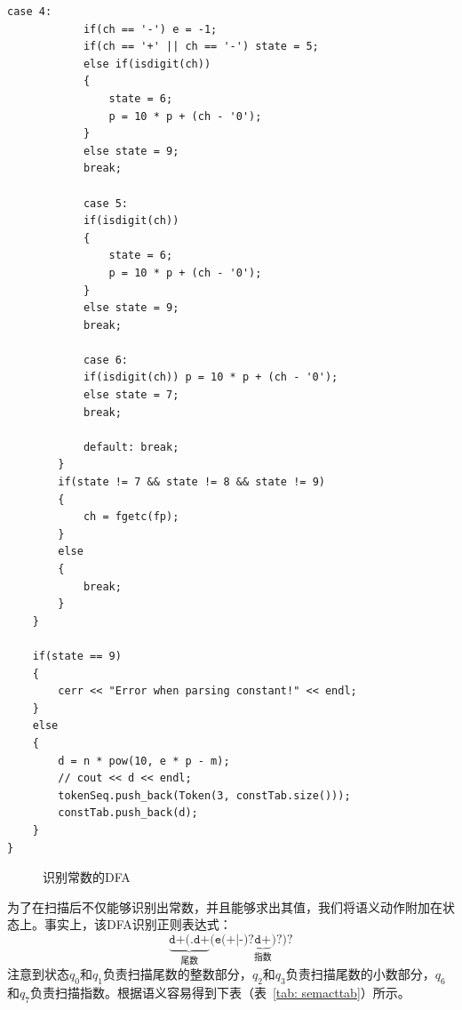 \documentclass{article}
\begin{document}
\begin{CJK*}{UTF8}{gbsn}
\begin{center}
\begin{lstlisting}[caption = {\texttt{readConst} 成员函数代码清单}, label = {lst: readconstlst}]
			case 4: 
			if(ch == '-') e = -1;
			if(ch == '+' || ch == '-') state = 5;
			else if(isdigit(ch))
			{
				state = 6;
				p = 10 * p + (ch - '0');
			}
			else state = 9;
			break;

			case 5:
			if(isdigit(ch)) 
			{
				state = 6;
				p = 10 * p + (ch - '0');
			}
			else state = 9;
			break;

			case 6:
			if(isdigit(ch)) p = 10 * p + (ch - '0');
			else state = 7;
			break;

			default: break;
		}
		if(state != 7 && state != 8 && state != 9)
		{
			ch = fgetc(fp);
		}
		else
		{
			break;
		}
	}

	if(state == 9)
	{
		cerr << "Error when parsing constant!" << endl;
	}
	else
	{
		d = n * pow(10, e * p - m);
		// cout << d << endl;
		tokenSeq.push_back(Token(3, constTab.size()));
		constTab.push_back(d);
	}
}
\end{lstlisting}
\end{center}

\begin{figure}[h!]
\centering
{}
\caption{识别常数的DFA}
\label{fig: constdfafig}
\end{figure}

为了在扫描后不仅能够识别出常数，并且能够求出其值，我们将语义动作附加在状态上。事实上，该DFA识别正则表达式：
\[ \underbrace{\texttt{d+(.d+}}_{\text{尾数}}\texttt{(e(+|-)?}\underbrace{\texttt{d+}}_{\text{指数}}\texttt{)?)?} \]
注意到状态$q_0$和$q_1$负责扫描尾数的整数部分，$q_2$和$q_3$负责扫描尾数的小数部分，$q_6$和$q_7$负责扫描指数。根据语义容易得到下表（表~\ref{tab: semacttab}）所示。


\end{CJK*}
\end{document}
